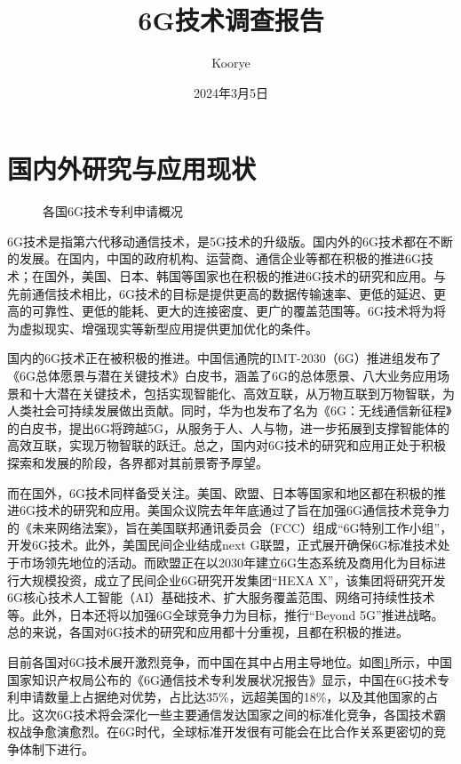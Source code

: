 \documentclass{article}
\title{6G技术调查报告}
\author{Koorye}
\date{2024年3月5日}
\begin{document}
\maketitle
\thispagestyle{fancy}

\section{国内外研究与应用现状}

\begin{figure}[h]
\centering
{}
\caption{各国6G技术专利申请概况}
\label{fig:6g-submit}
\end{figure}

6G技术\cite{jiang2021road}是指第六代移动通信技术，是5G技术的升级版。国内外的6G技术都在不断的发展。在国内，中国的政府机构、运营商、通信企业等都在积极的推进6G技术；在国外，美国、日本、韩国等国家也在积极的推进6G技术的研究和应用。与先前通信技术相比，6G技术的目标是提供更高的数据传输速率、更低的延迟、更高的可靠性、更低的能耗、更大的连接密度、更广的覆盖范围等。6G技术将为将为虚拟现实、增强现实等新型应用提供更加优化的条件。

国内的6G技术正在被积极的推进。中国信通院的IMT-2030（6G）推进组发布了《6G总体愿景与潜在关键技术》白皮书，涵盖了6G的总体愿景、八大业务应用场景和十大潜在关键技术，包括实现智能化、高效互联，从万物互联到万物智联，为人类社会可持续发展做出贡献。同时，华为也发布了名为《6G：无线通信新征程》的白皮书，提出6G将跨越5G，从服务于人、人与物，进一步拓展到支撑智能体的高效互联，实现万物智联的跃迁。总之，国内对6G技术的研究和应用正处于积极探索和发展的阶段，各界都对其前景寄予厚望。

而在国外，6G技术同样备受关注。美国、欧盟、日本等国家和地区都在积极的推进6G技术的研究和应用。美国众议院去年年底通过了旨在加强6G通信技术竞争力的《未来网络法案》，旨在美国联邦通讯委员会（FCC）组成“6G特别工作小组”，开发6G技术。此外，美国民间企业结成next G联盟，正式展开确保6G标准技术处于市场领先地位的活动。而欧盟正在以2030年建立6G生态系统及商用化为目标进行大规模投资，成立了民间企业6G研究开发集团“HEXA X”，该集团将研究开发6G核心技术人工智能（AI）基础技术、扩大服务覆盖范围、网络可持续性技术等。此外，日本还将以加强6G全球竞争力为目标，推行“Beyond 5G”推进战略。总的来说，各国对6G技术的研究和应用都十分重视，且都在积极的推进。

目前各国对6G技术展开激烈竞争，而中国在其中占用主导地位。如图\ref{fig:6g-submit}所示，中国国家知识产权局公布的《6G通信技术专利发展状况报告》显示，中国在6G技术专利申请数量上占据绝对优势，占比达35\%，远超美国的18\%，以及其他国家的占比。这次6G技术将会深化一些主要通信发达国家之间的标准化竞争，各国技术霸权战争愈演愈烈。在6G时代，全球标准开发很有可能会在比合作关系更密切的竞争体制下进行。
\end{document}
